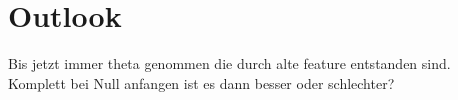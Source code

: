 \chapter{Outlook}

Bis jetzt immer theta genommen die durch alte feature entstanden sind.
Komplett bei Null anfangen ist es dann besser oder schlechter?




